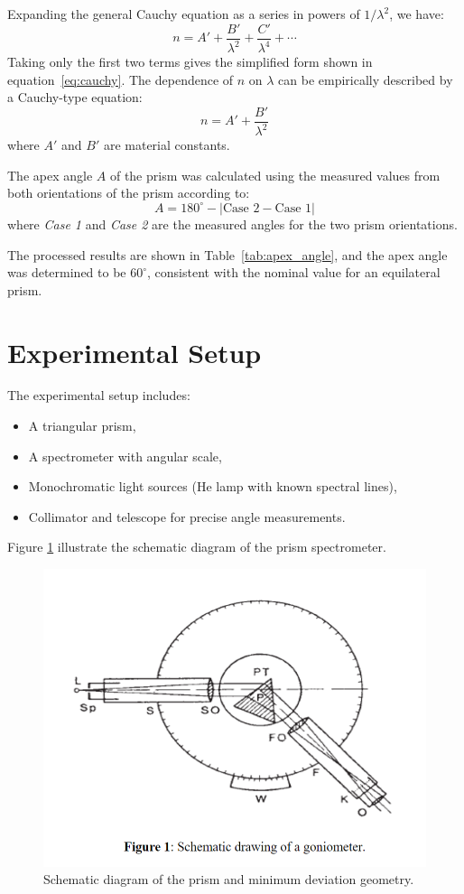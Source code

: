 \documentclass[journal]{IEEEtran}
\begin{document}
Expanding the general Cauchy equation as a series in powers of \( 1/\lambda^2 \), we have:
\begin{equation}
n = A' + \frac{B'}{\lambda^2} + \frac{C'}{\lambda^4} + \cdots
\end{equation}
Taking only the first two terms gives the simplified form shown in equation~\eqref{eq:cauchy}.
The dependence of \( n \) on \( \lambda \) can be empirically described by a Cauchy-type equation:
\begin{equation}
n = A' + \frac{B'}{\lambda^2}
\label{eq:cauchy}
\end{equation}
where \( A' \) and \( B' \) are material constants.

The apex angle \( A \) of the prism was calculated using the measured values from both orientations of the prism according to:
\begin{equation}
A = 180^\circ - \left| \text{Case 2} - \text{Case 1} \right|
\end{equation}
where \textit{Case 1} and \textit{Case 2} are the measured angles for the two prism orientations. 

The processed results are shown in Table~\ref{tab:apex_angle}, and the apex angle was determined to be \( 60^\circ \), consistent with the nominal value for an equilateral prism.

\section{Experimental Setup}
The experimental setup includes:
\begin{itemize}
    \item A triangular prism,
    \item A spectrometer with angular scale,
    \item Monochromatic light sources (He lamp with known spectral lines),
    \item Collimator and telescope for precise angle measurements.
\end{itemize}

Figure  \ref{fig:diagram} illustrate the schematic diagram of the prism spectrometer.
\begin{figure}[H]
    \centering
    \includegraphics[width=0.6\linewidth]{../IMAGES/prism_diagram.png}
    \caption{Schematic diagram of the prism and minimum deviation geometry.}
    \label{fig:diagram}
\end{figure}
\end{document}
